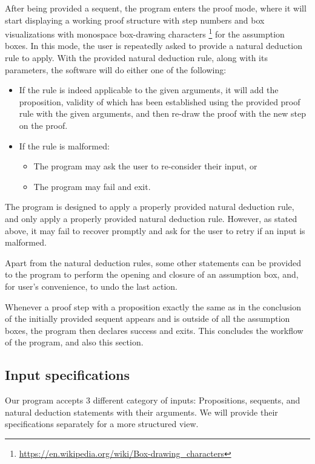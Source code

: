 \documentclass[12pt]{article}
\begin{document}
After being provided a sequent, the program enters the proof mode,
where it will start displaying a working proof structure with step
numbers and box visualizations with monospace box-drawing characters%
\footnote{\url{https://en.wikipedia.org/wiki/Box-drawing\_characters}}
for the assumption boxes. In this mode, the user is repeatedly asked to
provide a natural deduction rule to apply. With the provided
natural deduction rule, along with its parameters, the software
will do either one of the following:
\begin{itemize}
	\item If the rule is indeed applicable to the given arguments, it will
		add the proposition, validity of which has been established
		using the provided proof rule with the given arguments, and
		then re-draw the proof with the new step on the proof.
	\item If the rule is malformed:
		\begin{itemize}
			\item The program may ask the user to re-consider their
				input, or
			\item The program may fail and exit.
		\end{itemize}
\end{itemize}

The program is designed to apply a properly provided natural
deduction rule, and only apply a properly provided natural deduction
rule. However, as stated above, it may fail to recover promptly
and ask for the user to retry if an input is malformed.

Apart from the natural deduction rules, some other statements can be
provided to the program to perform the opening and closure of an assumption
box, and, for user's convenience, to undo the last action.

Whenever a proof step with a proposition exactly the same as in the
conclusion of the initially provided sequent appears and is outside of all
the assumption boxes, the program then declares success and
exits. This concludes the workflow of the program, and also this
section.

\subsection{Input specifications}

Our program accepts 3 different category of inputs:
Propositions, sequents, and natural deduction statements
with their arguments. We will provide their specifications
separately for a more structured view.
\end{document}
